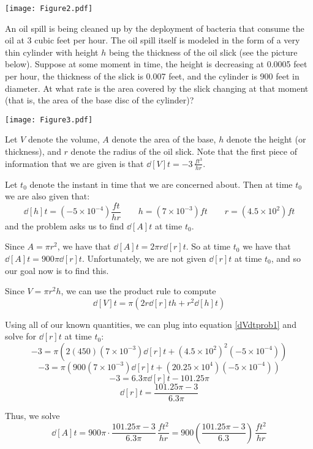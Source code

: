 \documentclass[nooutcomes]{ximera}
\begin{document}
	\begin{image}
	\texttt{[image: Figure2.pdf]}
	\end{image}

\begin{problem}
An oil spill is being cleaned up by the deployment of bacteria that consume the oil at 3 cubic feet per hour.  The oil spill itself is modeled in the form of a very thin cylinder with height $h$ being the thickness of the oil slick (see the picture below).  Suppose at some moment in time, the height is decreasing at 0.0005 feet per hour, the thickness of the slick is 0.007 feet, and the cylinder is 900 feet in diameter.  At what rate is the area covered by the slick changing at that moment (that is, the area of the base disc of the cylinder)?
	\begin{image}
	\texttt{[image: Figure3.pdf]}
	\end{image}
	
		\begin{freeResponse}
		Let $V$ denote the volume, $A$ denote the area of the base, $h$ denote the height (or thickness), and $r$ denote the radius of the oil slick.  Note that the first piece of information that we are given is that $\dd[V]{t} = -3 \, \frac{ft^3}{hr}$.  
		
		Let $t_0$ denote the instant in time that we are concerned about.  Then at time $t_0$ we are also given that:
		$$ \dd[h]{t} = \left( -5 \times 10^{-4} \right) \frac{ft}{hr}  \qquad  h = \left( 7 \times 10^{-3} \right) ft  \qquad  r = \left( 4.5 \times 10^2 \right) ft $$
		and the problem asks us to find $\dd[A]{t}$ at time $t_0$.  
		
		Since $A = \pi r^2$, we have that $\dd[A]{t} = 2 \pi r \dd[r]{t}$.  So at time $t_0$ we have that $\dd[A]{t} = 900 \pi \dd[r]{t}$.  Unfortunately, we are not given $\dd[r]{t}$ at time $t_0$, and so our goal now is to find this.
		
		Since $V = \pi r^2 h$, we can use the product rule to compute
		\begin{equation}\label{dVdtprob1}
		\dd[V]{t} = \pi \left( 2r \dd[r]{t} h + r^2 \dd[h]{t} \right)
		\end{equation}
		
		Using all of our known quantities, we can plug into equation \ref{dVdtprob1} and solve for $\dd[r]{t}$ at time $t_0$:
		$$ -3 = \pi \left( 2(450)(7 \times 10^{-3}) \dd[r]{t} + (4.5 \times 10^2)^2(-5 \times 10^{-4}) \right) $$
		$$ -3 = \pi \left( 900(7 \times 10^{-3}) \dd[r]{t} + (20.25 \times 10^4) (-5 \times 10^{-4}) \right) $$
		$$ -3 = 6.3 \pi \dd[r]{t} -101.25 \pi $$
		$$ \dd[r]{t} = \frac{101.25 \pi - 3}{6.3 \pi} $$
		
		Thus, we solve
		$$ \dd[A]{t} = 900 \pi \cdot \frac{101.25 \pi - 3}{6.3 \pi} \, \frac{ft^2}{hr} = 900 \left( \frac{101.25 \pi - 3}{6.3} \right) \, \frac{ft^2}{hr} $$
		
		\end{freeResponse}
		
		
\end{problem}
\end{document}
